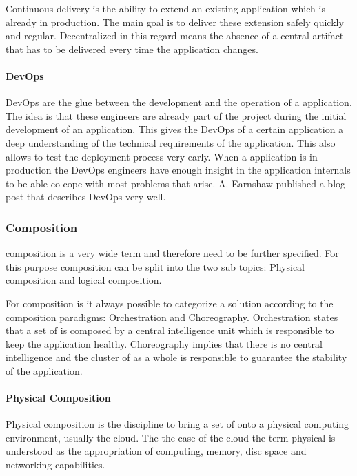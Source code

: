 Continuous delivery is the ability to extend an existing \ms{} application which
is already in production. The main goal is to deliver these extension safely
quickly and regular. Decentralized in this regard means the absence of a central
artifact that has to be delivered every time the application changes.

\paragraph{DevOps}

DevOps are the glue between the development and the operation of a \ms{}
application. The idea is that these engineers are already part of the project
during the initial development of an application. This gives the DevOps of a
certain application a deep understanding of the technical requirements of the
application. This also allows to test the deployment process very early. When a
\ms{} application is in production the DevOps engineers have enough insight in
the application internals to be able co cope with most problems that arise.
A. Earnshaw published a blog-post that describes DevOps very
well\cite{earnshaw2013devops}.

\subsubsection{\ms{} Composition}
\label{subsub:composition}

\ms{} composition is a very wide term and therefore need to be further
specified. For this purpose composition can be split into the two sub topics:
Physical composition and logical composition.

For \ms{} composition is it always possible to categorize a solution according
to the composition paradigms: Orchestration and Choreography. Orchestration
states that a set of \mss{} is composed by a central intelligence unit which is
responsible to keep the application healthy. Choreography implies that there is
no central intelligence and the cluster of \mss{} as a whole is responsible to
guarantee the stability of the application.

\paragraph{Physical Composition}

Physical composition is the discipline to bring a set of \mss{} onto a
physical computing environment, usually the cloud. The the case of the cloud the
term physical is understood as the appropriation of computing, memory, disc
space and networking capabilities.

